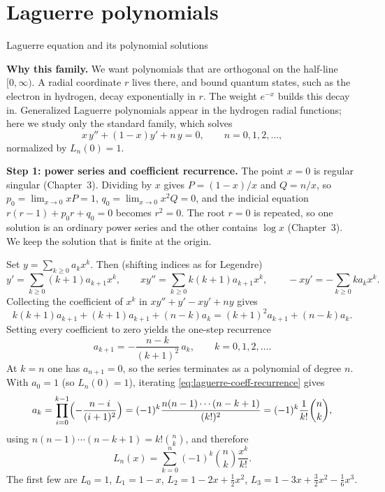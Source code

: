 \documentclass[11pt]{beamer}
\begin{document}
\section{Laguerre polynomials}

\begin{frame}[allowframebreaks=1.00]{Laguerre equation and its polynomial solutions}
\footnotesize

\textbf{Why this family.} We want polynomials that are orthogonal on the half-line
$[0,\infty)$. A radial coordinate $r$ lives there, and bound quantum states, such as
the electron in hydrogen, decay exponentially in $r$. The weight $e^{-x}$ builds
this decay in. Generalized Laguerre polynomials appear in the hydrogen radial
functions; here we study only the standard family, which solves
\begin{equation}
  x\,y''+(1-x)y'+n\,y=0,
  \qquad n=0,1,2,\ldots ,
  \label{eq:laguerre-eq}
\end{equation}
normalized by $L_n(0)=1$.

\textbf{Step 1: power series and coefficient recurrence.}
The point $x=0$ is regular singular (Chapter~3). Dividing by $x$ gives $P=(1-x)/x$ and $Q=n/x$,
so $p_0=\lim_{x\to0}xP=1$, $q_0=\lim_{x\to0}x^2Q=0$, and the indicial equation
$r(r-1)+p_0r+q_0=0$ becomes $r^2=0$. The root $r=0$ is repeated, so one solution is an
ordinary power series and the other contains $\log x$ (Chapter~3). We keep the solution
that is finite at the origin.

Set $y=\sum_{k\ge0}a_k x^k$.  Then (shifting indices as for Legendre)
\[
  y'=\sum_{k\ge0}(k+1)a_{k+1}x^k,\qquad
  xy''=\sum_{k\ge0}k(k+1)a_{k+1}x^k,\qquad
  -xy'=-\sum_{k\ge0}k a_k x^k.
\]
Collecting the coefficient of $x^k$ in $xy''+y'-xy'+ny$ gives
\[
  k(k+1)a_{k+1}+(k+1)a_{k+1}+(n-k)a_k
  =(k+1)^2 a_{k+1}+(n-k)a_k.
\]
Setting every coefficient to zero yields the one-step recurrence
\begin{equation}
  a_{k+1}=-\frac{n-k}{(k+1)^2}\,a_k,\qquad k=0,1,2,\ldots.
  \label{eq:laguerre-coeff-recurrence}
\end{equation}
At $k=n$ one has $a_{n+1}=0$, so the series terminates as a polynomial of degree $n$.
With $a_0=1$ (so $L_n(0)=1$), iterating \eqref{eq:laguerre-coeff-recurrence} gives
\[
  a_k
  =\prod_{i=0}^{k-1}\Bigl(-\frac{n-i}{(i+1)^2}\Bigr)
  =(-1)^k\frac{n(n-1)\cdots(n-k+1)}{(k!)^2}
  =(-1)^k\frac{1}{k!}\binom{n}{k},
\]
using $n(n-1)\cdots(n-k+1)=k!\binom nk$, and therefore
\begin{equation}
  L_n(x)
   =\sum_{k=0}^{n}
      (-1)^k\binom{n}{k}\frac{x^k}{k!}.
  \label{eq:laguerre-series}
\end{equation}
The first few are $L_0=1$, $L_1=1-x$, $L_2=1-2x+\tfrac12 x^2$,
$L_3=1-3x+\tfrac32 x^2-\tfrac16 x^3$.
\end{frame}
\end{document}
